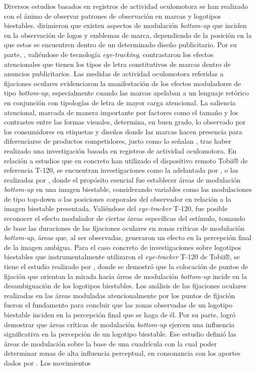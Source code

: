 \documentclass[spanish]{textolivre}
\begin{document}
Diversos estudios basados en registros de actividad oculomotora se han realizado con el ánimo de observar patrones de observación en marcas y logotipos biestables. \textcite{girisken_how_2014} dirimieron que existen aspectos de modulación \textit{bottom-up} que inciden en la observación de logos y emblemas de marca, dependiendo de la posición en la que estos se encuentren dentro de un determinado diseño publicitario. Por su parte, \textcite{puskarevic_eye_2016}, valiéndose de tecnología \textit{eye-tracking}, contrastaron los efectos atencionales que tienen los tipos de letra constitutivos de marcas dentro de anuncios publicitarios. Las medidas de actividad oculomotora referidas a fijaciones oculares evidenciaron la manifestación de los efectos moduladores de tipo \textit{bottom-up}, especialmente cuando las marcas apelaban a un lenguaje retórico en conjunción con tipologías de letra de mayor carga atencional. La saliencia atencional, marcada de manera importante por factores como el tamaño y los contrastes entre las formas visuales, determina, en buen grado, lo observado por los consumidores en etiquetas y diseños donde las marcas hacen presencia para diferenciarse de productos competidores, justo como lo señalan \textcite{peschel_increasing_2019}, tras haber realizado una investigación basada en registros de actividad oculomotora. En relación a estudios que en concreto han utilizado el dispositivo remoto Tobii® de referencia T-120, se encuentran investigaciones como la adelantada por \textcite{marroquin-ciendua_modulacion_2020}, o las realizadas por \textcite{rodriguez-martinez_ocular_2021,rodriguez-martinez_biestabilidad_2022}, donde el propósito esencial fue establecer áreas de modulación \textit{bottom-up} en una imagen biestable, considerando variables como las modulaciones de tipo top-down o las posiciones corporales del observador en relación a la imagen biestable presentada. Valiéndose del \textit{eye-tracker} T-120, fue posible reconocer el efecto modulador de ciertas áreas específicas del estímulo, tomando de base las duraciones de las fijaciones oculares en zonas críticas de modulación \textit{bottom-up}, áreas que, al ser observadas, generaron un efecto en la percepción final de la imagen ambigua. Para el caso concreto de investigaciones sobre logotipos biestables que instrumentalmente utilizaron el \textit{eye-tracker} T-120 de Tobii®, se tiene el estudio realizado por \textcite{rodriguez_bottom-up_2019}, donde se demostró que la colocación de puntos de fijación que orientan la mirada hacia áreas de modulación \textit{bottom-up} incide en la desambiguación de los logotipos biestables. Los análisis de las fijaciones oculares realizadas en las áreas moduladas atencionalmente por los puntos de fijación fueron el fundamento para concluir que las zonas observadas de un logotipo biestable inciden en la percepción final que se haga de él. Por su parte, \textcite{rodriguez-martinez_can_2024} logró demostrar que áreas críticas de modulación \textit{bottom-up} ejercen una influencia significativa en la percepción de un logotipo biestable. Ese estudio definió las áreas de modulación sobre la base de una cuadrícula con la cual poder determinar zonas de alta influencia perceptual, en consonancia con los aportes dados por \textcite{bernal_robayo_alisis_2020}. Los movimientos 
\end{document}
